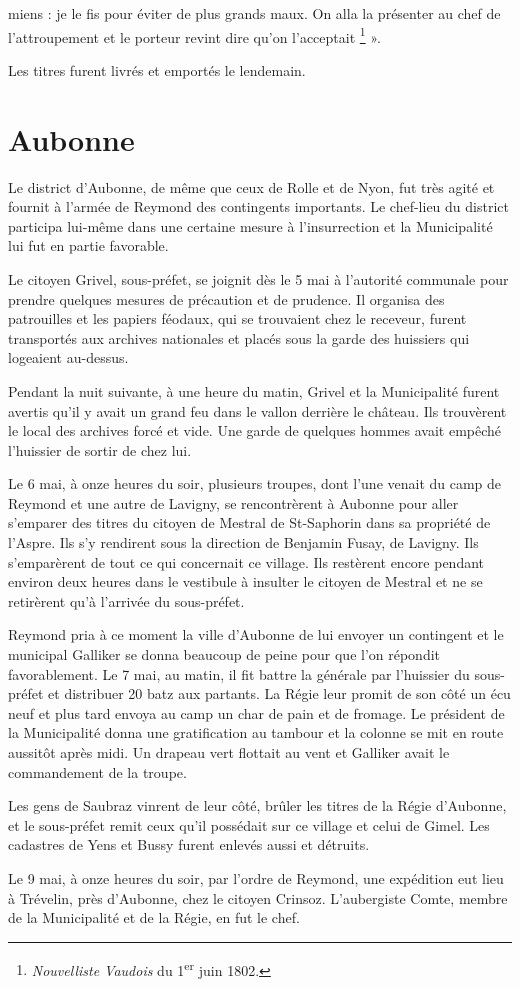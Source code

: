 \documentclass[french,twoside]{book} %
\newenvironment{quoteblock}%
  {\begin{quoting}}
  {\end{quoting}}
\newenvironment{quotebar}{%
    \def\FrameCommand{{\color{rubric!10!}\vrule width 0.5em} \hspace{0.9em}}%
    \def\OuterFrameSep{\itemsep} %
    \MakeFramed {\advance\hsize-\width \FrameRestore}
  }%
  {%
    \endMakeFramed
  }
\renewenvironment{quoteblock}%
  {%
    \savenotes
    \setstretch{0.9}
    \begin{quotebar}
  }
  {%
    \end{quotebar}
    \spewnotes
  }
\begin{document}
\begin{quoteblock}
miens : je le fis pour éviter de plus grands maux. On alla la présenter au chef de l’attroupement et le porteur revint dire qu’on l’acceptait \footnote{\emph{Nouvelliste Vaudois} du 1\textsuperscript{er} juin 1802.} ».
 \end{quoteblock}

\noindent Les titres furent livrés et emportés le lendemain.
\section[Aubonne]{Aubonne}
\noindent Le district d’Aubonne, de même que ceux de Rolle et de Nyon, fut très agité et fournit à l’armée de Reymond des contingents importants. Le chef-lieu du district participa lui-même dans une certaine mesure à l’insurrection et la Municipalité lui fut en partie favorable.\par
Le citoyen Grivel, sous-préfet, se joignit dès le 5 mai à l’autorité communale pour prendre quelques mesures de précaution et de prudence. Il organisa des patrouilles et les papiers féodaux, qui se trouvaient chez le receveur, furent transportés aux archives nationales et placés sous la garde des huissiers qui logeaient au-dessus.\par
Pendant la nuit suivante, à une heure du matin, Grivel et la Municipalité furent avertis qu’il y avait un grand feu dans le vallon derrière le château. Ils trouvèrent le local des archives forcé et vide. Une garde de quelques hommes avait empêché l’huissier de sortir de chez lui.\par
Le 6 mai, à onze heures du soir, plusieurs troupes, dont l’une venait du camp de Reymond et une autre de Lavigny, se rencontrèrent à Aubonne pour aller s’emparer des titres du citoyen de Mestral de St-Saphorin dans sa propriété de l’Aspre. Ils s’y rendirent sous la direction de Benjamin Fusay, de Lavigny. Ils s’emparèrent de tout ce qui concernait ce village. Ils restèrent encore pendant environ deux heures dans le vestibule à insulter le citoyen de Mestral et ne se retirèrent qu’à l’arrivée du sous-préfet.\par
Reymond pria à ce moment la ville d’Aubonne de lui envoyer un contingent et le municipal Galliker se donna beaucoup de peine pour que l’on répondit favorablement. Le 7 mai, au matin, il fit battre la générale par l’huissier du sous-préfet et distribuer 20 batz aux partants. La Régie leur promit de son côté un écu neuf et plus tard envoya au camp un char de pain et de fromage. Le président de la Municipalité donna une gratification au tambour et la colonne se mit en route aussitôt après midi. Un drapeau vert flottait au vent et Galliker avait le commandement de la troupe.\par
Les gens de Saubraz vinrent de leur côté, brûler les titres de la Régie d’Aubonne, et le sous-préfet remit ceux qu’il possédait sur ce village et celui de Gimel. Les cadastres de Yens et Bussy furent enlevés aussi et détruits.\par
Le 9 mai, à onze heures du soir, par l’ordre de Reymond, une expédition eut lieu à Trévelin, près d’Aubonne, chez le citoyen Crinsoz. L’aubergiste Comte, membre de la Municipalité et de la Régie, en fut le chef.\par
\end{document}
